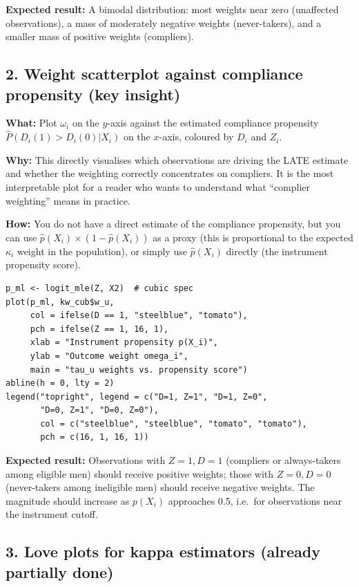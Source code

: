 \documentclass[12pt, a4paper]{article}
\begin{document}
\textbf{Expected result:} A bimodal distribution: most weights near zero
(unaffected observations), a mass of moderately negative weights (never-takers),
and a smaller mass of positive weights (compliers).

\subsection*{2. Weight scatterplot against compliance propensity (key insight)}

\textbf{What:} Plot $\omega_i$ on the $y$-axis against the estimated
compliance propensity $\hat{P}(D_i(1) > D_i(0) | X_i)$ on the $x$-axis,
coloured by $D_i$ and $Z_i$.

\textbf{Why:} This directly visualises which observations are driving the
LATE estimate and whether the weighting correctly concentrates on compliers.
It is the most interpretable plot for a reader who wants to understand what
``complier weighting'' means in practice.

\textbf{How:} You do not have a direct estimate of the compliance propensity,
but you can use $\hat{p}(X_i) \times (1 - \hat{p}(X_i))$ as a proxy (this
is proportional to the expected $\kappa_i$ weight in the population), or
simply use $\hat{p}(X_i)$ directly (the instrument propensity score).

\begin{verbatim}
p_ml <- logit_mle(Z, X2)  # cubic spec
plot(p_ml, kw_cub$w_u,
     col = ifelse(D == 1, "steelblue", "tomato"),
     pch = ifelse(Z == 1, 16, 1),
     xlab = "Instrument propensity p(X_i)",
     ylab = "Outcome weight omega_i",
     main = "tau_u weights vs. propensity score")
abline(h = 0, lty = 2)
legend("topright", legend = c("D=1, Z=1", "D=1, Z=0",
       "D=0, Z=1", "D=0, Z=0"),
       col = c("steelblue", "steelblue", "tomato", "tomato"),
       pch = c(16, 1, 16, 1))
\end{verbatim}

\textbf{Expected result:} Observations with $Z=1, D=1$ (compliers or
always-takers among eligible men) should receive positive weights; those
with $Z=0, D=0$ (never-takers among ineligible men) should receive negative
weights. The magnitude should increase as $p(X_i)$ approaches 0.5, i.e.\
for observations near the instrument cutoff.

\subsection*{3. Love plots for kappa estimators (already partially done)}
\end{document}
